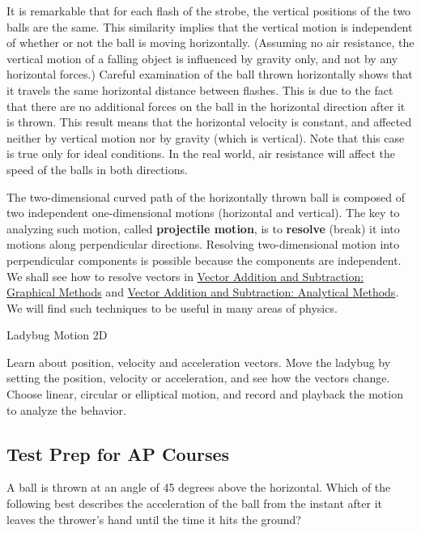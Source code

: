 \documentclass[
]{book}
\begin{document}
It is remarkable that for each flash of the strobe, the vertical
positions of the two balls are the same. This similarity implies that
the vertical motion is independent of whether or not the ball is moving
horizontally. (Assuming no air resistance, the vertical motion of a
falling object is influenced by gravity only, and not by any horizontal
forces.) Careful examination of the ball thrown horizontally shows that
it travels the same horizontal distance between flashes. This is due to
the fact that there are no additional forces on the ball in the
horizontal direction after it is thrown. This result means that the
horizontal velocity is constant, and affected neither by vertical motion
nor by gravity (which is vertical). Note that this case is true only for
ideal conditions. In the real world, air resistance will affect the
speed of the balls in both directions.

The two-dimensional curved path of the horizontally thrown ball is
composed of two independent one-dimensional motions (horizontal and
vertical). The key to analyzing such motion, called \textbf{projectile
motion}, is to \textbf{resolve} (break) it into motions along perpendicular
directions. Resolving two-dimensional motion into perpendicular
components is possible because the components are independent. We shall
see how to resolve vectors in \href{/m54781}{Vector Addition and Subtraction:
Graphical Methods} and \href{/m54783}{Vector Addition and Subtraction:
Analytical Methods}. We will find such techniques to be useful
in many areas of physics.

\hypertarget{eip-652}{}
Ladybug Motion 2D

Learn about position, velocity and acceleration vectors. Move the
ladybug by setting the position, velocity or acceleration, and see how
the vectors change. Choose linear, circular or elliptical motion, and
record and playback the motion to analyze the behavior. {\hfill\break
}

\hypertarget{fs-id1167062339457}{}

\hypertarget{fs-id1817678}{}
\hypertarget{test-prep-for-ap-courses-6}{%
\subsection{Test Prep for AP Courses}\label{test-prep-for-ap-courses-6}}

\hypertarget{fs-id1421044}{}
\leavevmode{}%
A ball is thrown at an angle of 45 degrees above the horizontal. Which
of the following best describes the acceleration of the ball from the
instant after it leaves the thrower's hand until the time it hits the
ground?
\end{document}
